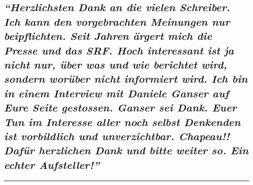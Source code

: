 \hypertarget{herzlichsten-dank-an-die-vielen-schreiber-ich-kann-den-vorgebrachten-meinungen-nur-beipflichten-seit-jahren-uxe4rgert-mich-die-presse-und-das-srf-hoch-interessant-ist-ja-nicht-nur-uxfcber-was-und-wie-berichtet-wird-sondern-woruxfcber-nicht-informiert-wird-ich-bin-in-einem-interview-mit-daniele-ganser-auf-eure-seite-gestossen-ganser-sei-dank-euer-tun-im-interesse-aller-noch-selbst-denkenden-ist-vorbildlich-und-unverzichtbar-chapeau-dafuxfcr-herzlichen-dank-und-bitte-weiter-so-ein-echter-aufsteller}{%
\subsection{\texorpdfstring{\emph{``Herzlichsten Dank an die vielen
Schreiber. Ich kann den vorgebrachten Meinungen nur beipflichten. Seit
Jahren ärgert mich die Presse und das SRF. Hoch interessant ist ja nicht
nur, über was und wie berichtet wird, sondern worüber nicht informiert
wird. Ich bin in einem Interview mit Daniele Ganser auf Eure Seite
gestossen. Ganser sei Dank. Euer Tun im Interesse aller noch selbst
Denkenden ist vorbildlich und unverzichtbar. Chapeau!! Dafür herzlichen
Dank und bitte weiter so. Ein echter
Aufsteller!''}}{``Herzlichsten Dank an die vielen Schreiber. Ich kann den vorgebrachten Meinungen nur beipflichten. Seit Jahren ärgert mich die Presse und das SRF. Hoch interessant ist ja nicht nur, über was und wie berichtet wird, sondern worüber nicht informiert wird. Ich bin in einem Interview mit Daniele Ganser auf Eure Seite gestossen. Ganser sei Dank. Euer Tun im Interesse aller noch selbst Denkenden ist vorbildlich und unverzichtbar. Chapeau!! Dafür herzlichen Dank und bitte weiter so. Ein echter Aufsteller!''}}\label{herzlichsten-dank-an-die-vielen-schreiber-ich-kann-den-vorgebrachten-meinungen-nur-beipflichten-seit-jahren-uxe4rgert-mich-die-presse-und-das-srf-hoch-interessant-ist-ja-nicht-nur-uxfcber-was-und-wie-berichtet-wird-sondern-woruxfcber-nicht-informiert-wird-ich-bin-in-einem-interview-mit-daniele-ganser-auf-eure-seite-gestossen-ganser-sei-dank-euer-tun-im-interesse-aller-noch-selbst-denkenden-ist-vorbildlich-und-unverzichtbar-chapeau-dafuxfcr-herzlichen-dank-und-bitte-weiter-so-ein-echter-aufsteller}}

\begin{center}\rule{0.5\linewidth}{\linethickness}\end{center}

